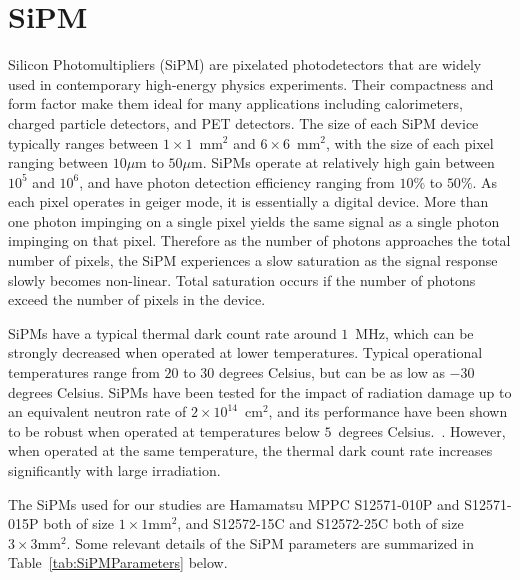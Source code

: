 \section{SiPM}
\label{sec:sipm}

Silicon Photomultipliers (SiPM) are pixelated photodetectors that are widely
used in contemporary high-energy physics experiments. Their compactness and form
factor make them ideal for many applications including calorimeters, charged
particle detectors, and PET detectors. The size of each SiPM device typically
ranges between $1\times 1$~$\mathrm{mm}^{2}$ and $6\times 6$~$\mathrm{mm}^{2}$,
with the size of each pixel ranging between $10\mu$m to $50\mu$m. SiPMs operate
at relatively high gain between $10^{5}$ and $10^{6}$, and have photon detection
efficiency ranging from $10\%$ to $50\%$. As each pixel operates in geiger mode, it is essentially a digital
device. More than one photon impinging on a single pixel yields the same signal
as a single photon impinging on that pixel. Therefore as the number of photons
approaches the total number of pixels, the SiPM experiences a slow saturation as
the signal response slowly becomes non-linear. Total saturation occurs 
if the number of photons exceed the number of pixels in the device. 


SiPMs have a typical thermal dark count rate around $1$~MHz, which can be
strongly decreased when operated at lower temperatures. Typical operational
temperatures range from $20$ to $30$ degrees Celsius, but can be as low as $-30$
degrees Celsius. SiPMs have been tested for the impact of radiation damage up to
an equivalent neutron rate of $2\times10^{14}$~$\mathrm{cm}^{2}$, and its
performance have been shown to be robust when operated at temperatures below 
$5$~degrees Celsius.~\cite{SiPMIrradiated1,SiPMIrradiated2}. 
However, when operated at the same temperature, the thermal dark count rate increases
significantly with large irradiation.

The SiPMs used for our studies are Hamamatsu MPPC S12571-010P and S12571-015P both of 
size $1\times1\mathrm{mm}^{2}$, and S12572-15C and S12572-25C both of size 
$3\times3\mathrm{mm}^{2}$. Some relevant details of the SiPM parameters
are summarized in Table~\ref{tab:SiPMParameters} below.

